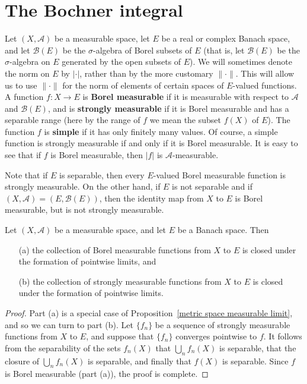 \section{The Bochner integral}
Let $(X,\mathcal{A})$ be a measurable space, let $E$ be a real or complex Banach space, and let $\mathcal{B}(E)$ be the $\sigma$-algebra of Borel subsets of $E$ (that is, let $\mathcal{B}(E)$ be the $\sigma$-algebra on $E$ generated by the open subsets of $E$). We will sometimes denote the norm on $E$ by $|\cdot|$, rather than by the more customary $\|\cdot\|$. This will allow us to use $\|\cdot\|$ for the norm of elements of certain spaces of $E$-valued functions. A function $f:X\to E$ is \textbf{Borel measurable} if it is measurable with respect to $\mathcal{A}$ and $\mathcal{B}(E)$, and is \textbf{strongly measurable} if it is Borel measurable and has a separable range (here by the range of $f$ we mean the subset $f(X)$ of $E$). The function $f$ is \textbf{simple} if it has only finitely many values. Of course, a simple function is strongly measurable if and only if it is Borel measurable. It is easy to see that if $f$ is Borel measurable, then $|f|$ is $\mathcal{A}$-measurable.\par
Note that if $E$ is separable, then every $E$-valued Borel measurable function is strongly measurable. On the other hand, if $E$ is not separable and if $(X,\mathcal{A})=(E,\mathcal{B}(E))$, then the identity map from $X$ to $E$ is Borel measurable, but is not strongly measurable.
\begin{proposition}\label{measurable vector value closed under limit}
Let $(X,\mathcal{A})$ be a measurable space, and let $E$ be a Banach space. Then
\begin{itemize}
\item[(a)] the collection of Borel measurable functions from $X$ to $E$ is closed under the formation of pointwise limits, and
\item[(b)] the collection of strongly measurable functions from $X$ to $E$ is closed under the formation of pointwise limits.
\end{itemize}
\end{proposition}
\begin{proof}
Part (a) is a special case of Proposition~\ref{metric space measurable limit}, and so we can turn to part (b). Let $\{f_n\}$ be a sequence of strongly measurable functions from $X$ to $E$, and suppose that $\{f_n\}$ converges pointwise to $f$. It follows from the separability of the sets $f_n(X)$ that $\bigcup_nf_n(X)$ is separable, that the closure of $\bigcup_nf_n(X)$ is separable, and finally that $f(X)$ is separable. Since $f$ is Borel measurable (part (a)), the proof is complete.
\end{proof}
